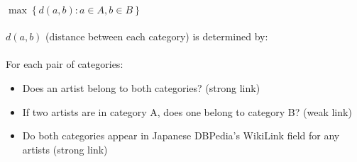 \documentclass[11pt]{article}
\begin{document}
\paragraph{} \(
	\max \left\{ d(a,b) : a \in A, b \in B \right\}
\)

 \paragraph{} $d(a,b)$ (distance between each category) is determined by:

\paragraph{} For each pair of categories:
\begin{itemize}
	\item Does an artist belong to both categories? (strong link)
	\item If two artists are in category A, does one belong to category B? (weak link)
	\item Do both categories appear in Japanese DBPedia's WikiLink field for any artists (strong link)
\end{itemize}
\end{document}
